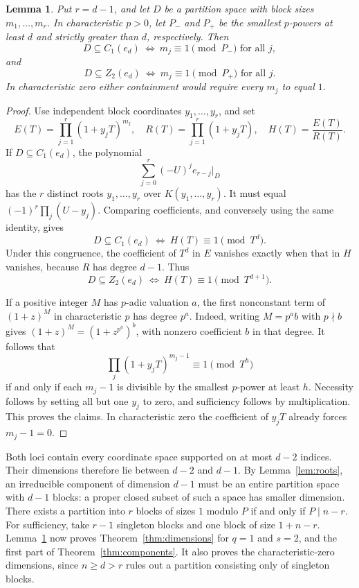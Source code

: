 \documentclass[11pt]{article}
\newtheorem{lemma}[theorem]{Lemma}
\theoremstyle{remark}
\begin{document}
\begin{lemma}\label{lem:block}
Put $r=d-1$, and let $D$ be a partition space with block sizes
$m_1,\ldots,m_r$. In characteristic $p>0$, let $P_-$ and $P_+$
be the smallest $p$-powers at least $d$ and strictly greater than
$d$, respectively. Then
\[
 D\subseteq C_1(e_d)\ \Longleftrightarrow\ m_j\equiv1\pmod{P_-}\text{ for all }j,
\]
and
\[
 D\subseteq Z_2(e_d)\ \Longleftrightarrow\ m_j\equiv1\pmod{P_+}\text{ for all }j.
\]
In characteristic zero either containment would require every
$m_j$ to equal $1$.
\end{lemma}
\begin{proof}
Use independent block coordinates $y_1,\ldots,y_r$, and set
\[
 E(T)=\prod_{j=1}^r(1+y_jT)^{m_j},\quad
 R(T)=\prod_{j=1}^r(1+y_jT),\quad
 H(T)=\frac{E(T)}{R(T)}.
\]
If $D\subseteq C_1(e_d)$, the polynomial
\[
 \sum_{j=0}^r(-U)^j e_{r-j}|_D
\]
has the $r$ distinct roots $y_1,\ldots,y_r$ over
$K(y_1,\ldots,y_r)$. It must equal
$(-1)^r\prod_j(U-y_j)$. Comparing coefficients, and conversely
using the same identity, gives
\begin{equation}
 D\subseteq C_1(e_d)\ \Longleftrightarrow\ H(T)\equiv1\pmod{T^d}.
 \label{eq:blockcritical}
\end{equation}
Under this congruence, the coefficient of $T^d$ in $E$ vanishes
exactly when that in $H$ vanishes, because $R$ has degree $d-1$.
Thus
\begin{equation}
 D\subseteq Z_2(e_d)\ \Longleftrightarrow\ H(T)\equiv1\pmod{T^{d+1}}.
 \label{eq:blockzero}
\end{equation}

If a positive integer $M$ has $p$-adic valuation $a$, the first
nonconstant term of $(1+z)^M$ in characteristic $p$ has degree
$p^a$. Indeed, writing $M=p^a b$ with $p\nmid b$ gives
$(1+z)^M=(1+z^{p^a})^b$, with nonzero coefficient $b$ in that
degree. It follows that
\[
 \prod_j(1+y_jT)^{m_j-1}\equiv1\pmod{T^h}
\]
if and only if each $m_j-1$ is divisible by the smallest $p$-power
at least $h$. Necessity follows by setting all but one $y_j$ to
zero, and sufficiency follows by multiplication. This proves the
claims. In characteristic zero the coefficient of $y_jT$ already
forces $m_j-1=0$.
\end{proof}

Both loci contain every coordinate space supported on at most
$d-2$ indices. Their dimensions therefore lie between $d-2$ and
$d-1$. By Lemma~\ref{lem:roots}, an irreducible component of
dimension $d-1$ must be an entire partition space with $d-1$
blocks: a proper closed subset of such a space has smaller dimension.
There exists a partition into $r$ blocks of sizes $1$ modulo $P$
if and only if $P\mid n-r$. For sufficiency, take $r-1$ singleton
blocks and one block of size $1+n-r$. Lemma~\ref{lem:block} now
proves Theorem~\ref{thm:dimensions} for $q=1$ and $s=2$, and the
first part of Theorem~\ref{thm:components}. It also proves the
characteristic-zero dimensions, since $n\ge d>r$ rules out a
partition consisting only of singleton blocks.
\end{document}
